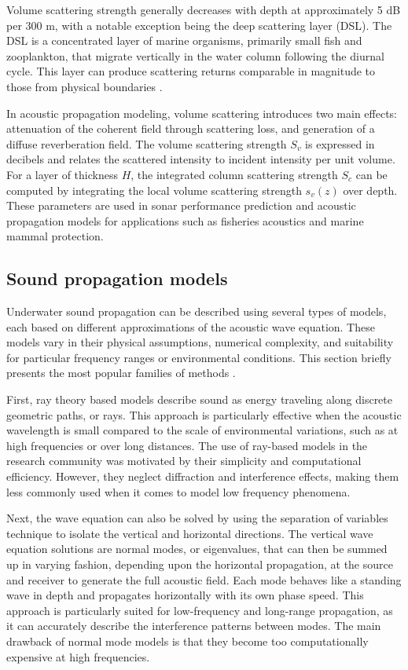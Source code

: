 \documentclass[fleqn]{jaes}
\begin{document}
Volume scattering strength generally decreases with depth at approximately 5 dB per 300 m, with a notable exception being the deep scattering layer (DSL). The DSL is a concentrated layer of marine organisms, primarily small fish and zooplankton, that migrate vertically in the water column following the diurnal cycle. This layer can produce scattering returns comparable in magnitude to those from physical boundaries \cite{Jensen}.

In acoustic propagation modeling, volume scattering introduces two main effects: attenuation of the coherent field through scattering loss, and generation of a diffuse reverberation field. The volume scattering strength $S_v$ is expressed in decibels and relates the scattered intensity to incident intensity per unit volume. For a layer of thickness $H$, the integrated column scattering strength $S_c$ can be computed by integrating the local volume scattering strength $s_v(z)$ over depth. These parameters are used in sonar performance prediction and acoustic propagation models for applications such as fisheries acoustics and marine mammal protection.

\subsection{Sound propagation models}
Underwater sound propagation can be described using several types of models, each based on different approximations of the acoustic wave equation. These models vary in their physical assumptions, numerical complexity, and suitability for particular frequency ranges or environmental conditions. This section briefly presents the most popular families of methods \cite{propagationmodels, Jensen}.

First, ray theory based models describe sound as energy traveling along discrete geometric paths, or rays. This approach is particularly effective when the acoustic wavelength is small compared to the scale of environmental variations, such as at high frequencies or over long distances. The use of ray-based models in the research community was motivated by their simplicity and computational efficiency. However, they neglect diffraction and interference effects, making them less commonly used when it comes to model low frequency phenomena\cite{hovem2019}.

Next, the wave equation can also be solved by using the separation of variables technique to isolate the vertical and horizontal directions. The vertical wave equation solutions are
normal modes, or eigenvalues, that can then be summed up in varying
fashion, depending upon the horizontal propagation, at the source and receiver to
generate the full acoustic field.
Each mode behaves like a standing wave in depth and propagates horizontally with its own phase speed. This approach is particularly suited for low-frequency and long-range propagation, as it can accurately describe the interference patterns between modes. The main drawback of normal mode models is that they become too computationally expensive at high frequencies\cite{propagationmodels}.
\end{document}
